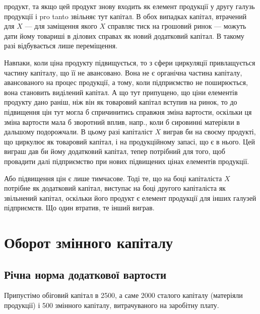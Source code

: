 \parcont{}  %
продукт, та якщо цей продукт знову входить як елемент продукції у
другу галузь продукції і pro tanto звільняє тут капітал. В обох випадках
капітал, втрачений для $X$ — для заміщення якого $X$ справляє тиск на грошовий
ринок — можуть дати йому товариші в ділових справах як новий
додатковий капітал. В такому разі відбувається лише переміщення.

Навпаки, коли ціна продукту підвищується, то з сфери циркуляції
привлащується частину капіталу, що її не авансовано. Вона не є
органічна частина капіталу, авансованого на процес продукції, а тому,
коли підприємство не поширюється, вона становить виділений капітал.
А що тут припущено, що ціни елементів продукту дано раніш, ніж він
як товаровий капітал вступив на ринок, то до підвищення цін тут могла б
спричинитись справжня зміна вартости, оскільки ця зміна вартости мала б
зворотний вплив, напр., коли б сировинні матеріяли в дальшому
подорожчали. В цьому разі капіталіст $X$ виграв би на своєму продукті,
що циркулює як товаровий капітал, і на продукційному запасі, що є в
нього. Цей виграш дав би йому додатковий капітал, тепер потрібний для
того, щоб провадити далі підприємство при нових підвищених цінах елементів
продукції.

Або підвищення цін є лише тимчасове. Тоді те, що на боці капіталіста
$X$ потрібне як додатковий капітал, виступає на боці другого капіталіста
як звільнений капітал, оскільки його продукт є елемент продукції
для інших галузей підприємств. Що один втратив, те інший виграв.

\section{Оборот змінного капіталу}

\subsection{Річна норма додаткової вартости}

Припустімо обіговий капітал в 2500, а саме  \deq{} 2000 сталого капіталу (матеріяли продукції) і  \deq{} 500 змінного
капіталу, витрачуваного на заробітну плату.

